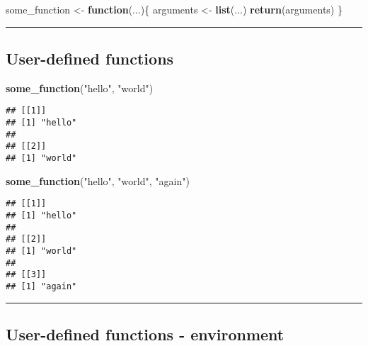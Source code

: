\documentclass[]{article}
\newenvironment{Shaded}{\begin{snugshade}}{\end{snugshade}}
\newcommand{\ControlFlowTok}[1]{\textcolor[rgb]{0.13,0.29,0.53}{\textbf{#1}}}
\newcommand{\KeywordTok}[1]{\textcolor[rgb]{0.13,0.29,0.53}{\textbf{#1}}}
\newcommand{\NormalTok}[1]{#1}
\newcommand{\StringTok}[1]{\textcolor[rgb]{0.31,0.60,0.02}{#1}}
\begin{document}
\begin{Shaded}
\begin{Highlighting}[]
\NormalTok{some_function <-}\StringTok{ }\ControlFlowTok{function}\NormalTok{(...)\{}
\NormalTok{  arguments <-}\StringTok{ }\KeywordTok{list}\NormalTok{(...)}
  \KeywordTok{return}\NormalTok{(arguments)}
\NormalTok{\}}
\end{Highlighting}
\end{Shaded}

\begin{center}\rule{0.5\linewidth}{\linethickness}\end{center}

\hypertarget{user-defined-functions-1}{%
\subsection{User-defined functions}\label{user-defined-functions-1}}

\begin{Shaded}
\begin{Highlighting}[]
\KeywordTok{some_function}\NormalTok{(}\StringTok{"hello"}\NormalTok{, }\StringTok{"world"}\NormalTok{)}
\end{Highlighting}
\end{Shaded}

\begin{verbatim}
## [[1]]
## [1] "hello"
## 
## [[2]]
## [1] "world"
\end{verbatim}

\begin{Shaded}
\begin{Highlighting}[]
\KeywordTok{some_function}\NormalTok{(}\StringTok{"hello"}\NormalTok{, }\StringTok{"world"}\NormalTok{, }\StringTok{"again"}\NormalTok{)}
\end{Highlighting}
\end{Shaded}

\begin{verbatim}
## [[1]]
## [1] "hello"
## 
## [[2]]
## [1] "world"
## 
## [[3]]
## [1] "again"
\end{verbatim}

\begin{center}\rule{0.5\linewidth}{\linethickness}\end{center}

\hypertarget{user-defined-functions---environment}{%
\subsection{User-defined functions -
environment}\label{user-defined-functions---environment}}
\end{document}
